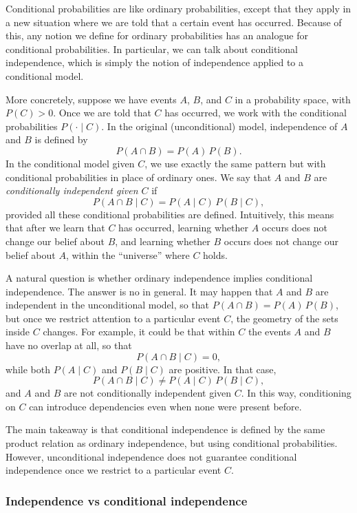 Conditional probabilities are like ordinary probabilities, except that they apply in a new situation where we are told that a certain event has occurred. Because of this, any notion we define for ordinary probabilities has an analogue for conditional probabilities. In particular, we can talk about conditional independence, which is simply the notion of independence applied to a conditional model.

More concretely, suppose we have events \(A\), \(B\), and \(C\) in a probability space, with \(P(C) > 0\). Once we are told that \(C\) has occurred, we work with the conditional probabilities \(P(\cdot \mid C)\). In the original (unconditional) model, independence of \(A\) and \(B\) is defined by
\[
P(A \cap B) = P(A)\,P(B).
\]
In the conditional model given \(C\), we use exactly the same pattern but with conditional probabilities in place of ordinary ones. We say that \(A\) and \(B\) are \textit{conditionally independent given \(C\)} if
\[
P(A \cap B \mid C) = P(A \mid C)\,P(B \mid C),
\]
provided all these conditional probabilities are defined. Intuitively, this means that after we learn that \(C\) has occurred, learning whether \(A\) occurs does not change our belief about \(B\), and learning whether \(B\) occurs does not change our belief about \(A\), within the “universe” where \(C\) holds.

A natural question is whether ordinary independence implies conditional independence. The answer is no in general. It may happen that \(A\) and \(B\) are independent in the unconditional model, so that \(P(A \cap B) = P(A)\,P(B)\), but once we restrict attention to a particular event \(C\), the geometry of the sets inside \(C\) changes. For example, it could be that within \(C\) the events \(A\) and \(B\) have no overlap at all, so that
\[
P(A \cap B \mid C) = 0,
\]
while both \(P(A \mid C)\) and \(P(B \mid C)\) are positive. In that case,
\[
P(A \cap B \mid C) \neq P(A \mid C)\,P(B \mid C),
\]
and \(A\) and \(B\) are not conditionally independent given \(C\). In this way, conditioning on \(C\) can introduce dependencies even when none were present before.

The main takeaway is that conditional independence is defined by the same product relation as ordinary independence, but using conditional probabilities. However, unconditional independence does not guarantee conditional independence once we restrict to a particular event \(C\).


\subsubsection{Independence vs conditional independence}

